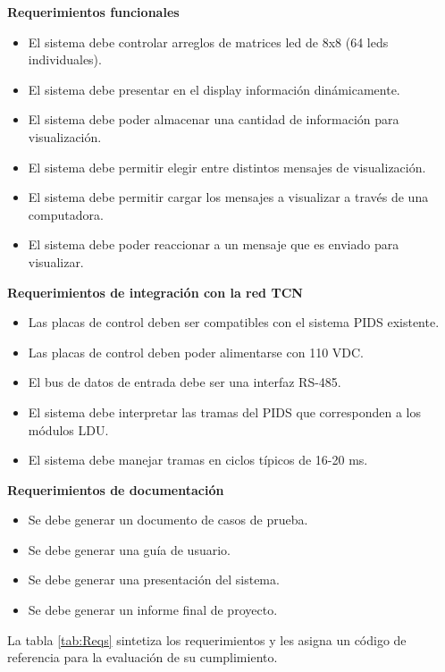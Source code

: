 \pagebreak

\textbf{Requerimientos funcionales}

\begin{itemize}
\item El sistema debe controlar arreglos de matrices led de 8x8 (64 leds individuales).
\item El sistema debe presentar en el display información dinámicamente.
\item El sistema debe poder almacenar una cantidad de información para visualización.
\item El sistema debe permitir elegir entre distintos mensajes de visualización.
\item El sistema debe permitir cargar los mensajes a visualizar a través de una computadora.
\item El sistema debe poder reaccionar a un mensaje que es enviado para visualizar.
\end{itemize}

\textbf{Requerimientos de integración con la red TCN
}\begin{itemize}
\item Las placas de control deben ser compatibles con el sistema PIDS existente.
\item Las placas de control deben poder alimentarse con 110 VDC.
\item El bus de datos de entrada debe ser una interfaz RS-485.
\item El sistema debe interpretar las tramas del PIDS que corresponden a los módulos LDU.
\item El sistema debe manejar tramas en ciclos típicos de 16-20 ms.
\end{itemize}

\textbf{Requerimientos de documentación
}\begin{itemize}
\item Se debe generar un documento de casos de prueba.
\item Se debe generar una guía de usuario.
\item Se debe generar una presentación del sistema.
\item Se debe generar un informe final de proyecto.
\end{itemize}

La tabla \ref{tab:Reqs} sintetiza los requerimientos y les asigna un código de referencia para la evaluación de su cumplimiento.
	
